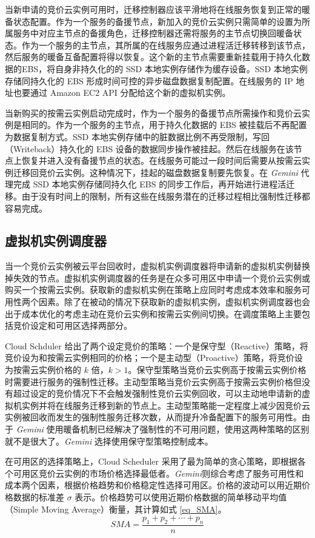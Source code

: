 当新申请的竞价云实例可用时，迁移控制器应该平滑地将在线服务恢复到正常的暖备状态配置。作为一个服务的备援节点，新加入的竞价云实例只需简单的设置为所属服务中对应主节点的备援角色，迁移控制器还需将服务的主节点切换回暖备状态。作为一个服务的主节点，其所属的在线服务应通过进程活迁移转移到该节点，然后服务的暖备互备配置将得以恢复。这个新的主节点需要重新挂载用于持久化数据的EBS，将自身非持久化的的 SSD 本地实例存储作为缓存设备。SSD 本地实例存储同持久化的 EBS 形成时间可控的异步磁盘数据复制配置。在线服务的 IP 地址也要通过 Amazon EC2 API 分配给这个新的虚拟机实例。

当新购买的按需云实例启动完成时，作为一个服务的备援节点所需操作和竞价云实例是相同的。作为一个服务的主节点，用于持久化数据的 EBS 被挂载后不再配置为数据复制方式。SSD 本地实例存储中的脏数据比例不再受限制，写回（Writeback）持久化的 EBS 设备的数据同步操作被挂起。然后在线服务在该节点上恢复并进入没有备援节点的状态。在线服务可能过一段时间后需要从按需云实例迁移回竞价云实例。这种情况下，挂起的磁盘数据复制要先恢复。在 \emph{Gemini} 代理完成 SSD 本地实例存储同持久化 EBS 的同步工作后，再开始进行进程活迁移。由于没有时间上的限制，所有这些在线服务潜在的迁移过程相比强制性迁移都容易完成。

\subsection{虚拟机实例调度器}
当一个竞价云实例被云平台回收时，虚拟机实例调度器将申请新的虚拟机实例替换掉失效的节点。虚拟机实例调度器的任务是在众多可用区中申请一个竞价云实例或购买一个按需云实例。获取新的虚拟机实例在策略上应同时考虑成本效率和服务可用性两个因素。除了在被动的情况下获取新的虚拟机实例，虚拟机实例调度器也会出于成本优化的考虑主动在竞价云实例和按需云实例间切换。在调度策略上主要包括竞价设定和可用区选择两部分。

Cloud Schduler \cite{He:2015:CCH:2749246.2749275} 给出了两个设定竞价的策略：一个是保守型（Reactive）策略，将竞价设为和按需云实例相同的价格；一个是主动型（Proactive）策略，将竞价设为按需云实例价格的 $k$ 倍，$k > 1$。保守型策略当竞价云实例高于按需云实例价格时需要进行服务的强制性迁移。主动型策略当竞价云实例高于按需云实例价格但没有超过设定的竞价情况下不会触发强制性竞价云实例回收，可以主动地申请新的虚拟机实例并将在线服务迁移到新的节点上。主动型策略能一定程度上减少因竞价云实例被回收而发生的强制性服务迁移次数，从而提升冷备配置下的服务可用性。由于 \emph{Gemini} 使用暖备机制已经解决了强制性的不可用问题，使用这两种策略的区别就不是很大了。\emph{Gemini} 选择使用保守型策略控制成本。

在可用区的选择策略上，Cloud Scheduler 采用了最为简单的贪心策略，即根据各个可用区竞价云实例的市场价格选择最低者。\emph{Gemini}则综合考虑了服务可用性和成本两个因素，根据价格趋势和价格稳定性选择可用区。价格的波动可以用近期价格数据的标准差 $\sigma$ 表示。价格趋势可以使用近期价格数据的简单移动平均值（Simple Moving Average）衡量，其计算如式 \eqref{eq_SMA}。
\begin{equation}\label{eq_SMA}
SMA = \frac{p_1 + p_2 + \cdots + p_n}{n}
\end{equation}

